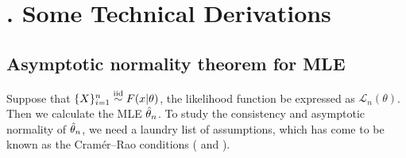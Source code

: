 \section{$\!\!\!\!\!\!\!$. Some Technical Derivations}      %

\subsection{Asymptotic normality theorem for MLE}       %

Suppose that $\{X\}_{i=1}^n \stackrel{{\rm iid}}{\sim} F(x|\theta)$, the likelihood function be expressed as $\mathcal{L}_n(\theta)$. Then we calculate the MLE $\hat{\theta}_n$. To study the consistency and asymptotic normality of $\hat{\theta}_n$, we need a laundry list of assumptions, which has come to be known as the Cram\'er--Rao conditions (\cite{LC1998} and \cite{Lehmann1999}).
